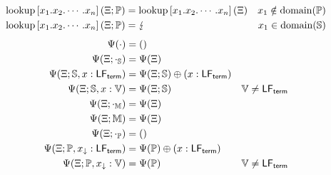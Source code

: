 \begin{equation*}
\begin{aligned}
\operatorname{lookup}\left[x_1.x_2.\cdots.x_n\right]\left(\Xi; \mathbb{P}\right) &= \operatorname{lookup}\left[x_1.x_2.\cdots.x_n\right]\left(\Xi\right) & x_1 \notin \operatorname{domain}(\mathbb{P})\\
\operatorname{lookup}\left[x_1.x_2.\cdots.x_n\right]\left(\Xi; \mathbb{P}\right) &= \lightning & x_1 \in \operatorname{domain}(\mathbb{S})
\end{aligned}
\end{equation*}
\begin{equation*}
\begin{aligned}
\Psi(\cdot) &= ()\\
\Psi(\Xi; \cdot_{\mathbb{S}}) &= \Psi(\Xi)\\
\Psi(\Xi; \mathbb{S}, x : \mathsf{LF}_{\mathsf{term}}) &= \Psi(\Xi; \mathbb{S}) \oplus (x : \mathsf{LF}_{\mathsf{term}})\\
\Psi(\Xi; \mathbb{S}, x : \mathbb{V}) &= \Psi(\Xi; \mathbb{S}) & \mathbb{V} \neq \mathsf{LF}_{\mathsf{term}}\\
\Psi(\Xi; \cdot_{\mathbb{M}}) &= \Psi(\Xi)\\
\Psi(\Xi; \mathbb{M}) &= \Psi(\Xi)\\
\Psi(\Xi; \cdot_{\mathbb{P}}) &= ()\\
\Psi(\Xi; \mathbb{P}, x_\downarrow : \mathsf{LF}_{\mathsf{term}}) &= \Psi(\mathbb{P}) \oplus (x : \mathsf{LF}_{\mathsf{term}})\\
\Psi(\Xi; \mathbb{P}, x_\downarrow : \mathbb{V}) &= \Psi(\mathbb{P}) & \mathbb{V} \neq \mathsf{LF}_{\mathsf{term}}
\end{aligned}
\end{equation*}



